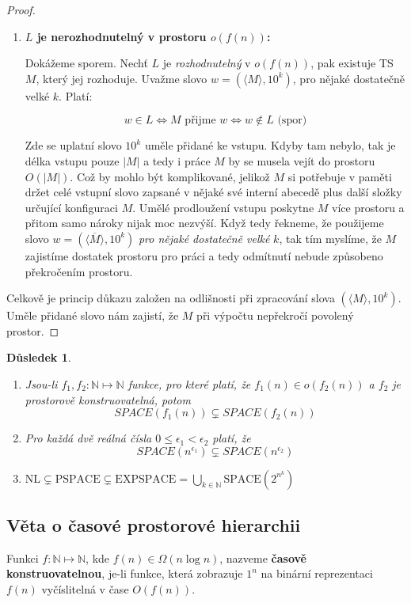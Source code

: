\documentclass[11pt]{report} %
\newcommand{\N}{\mathbb{N}}
\newtheorem{implication}{Důsledek}[section]
\numberwithin{equation}{section}
\begin{document}
\begin{proof}
\begin{enumerate}
		\item \textbf{$L$ je nerozhodnutelný v prostoru $o(f(n))$:}
		
		Dokážeme sporem. Nechť $L$ je \textit{rozhodnutelný} v $o(f(n))$, pak existuje TS $M$, který jej rozhoduje. Uvažme slovo $w = (\langle M \rangle, 10^k)$, pro nějaké dostatečně velké $k$. Platí:

		$$w \in L \Leftrightarrow M \text{ přijme } w \Leftrightarrow w \notin L \text{ (spor)}$$

		
		Zde se uplatní slovo $10^k$ uměle přidané ke vstupu. Kdyby tam nebylo, tak je délka vstupu pouze $|M|$ a tedy i práce $M$ by se musela vejít do prostoru $O(|M|)$. Což by mohlo být komplikované, jelikož $M$ si potřebuje v paměti držet celé vstupní slovo zapsané v nějaké své interní abecedě plus další složky určující konfiguraci $M$. Umělé prodloužení vstupu poskytne $M$ více prostoru a přitom samo nároky nijak moc nezvýší. Když tedy řekneme, že použijeme slovo $w = (\langle \overline{M} \rangle, 10^k)$ \textit{pro nějaké dostatečně velké} $k$, tak tím myslíme, že $M$ zajistíme dostatek prostoru pro práci a tedy odmítnutí nebude způsobeno překročením prostoru.
	\end{enumerate}
	
	Celkově je princip důkazu založen na odlišnosti při zpracování slova $(\langle M \rangle, 10^k)$. Uměle přidané slovo nám zajistí, že $M$ při výpočtu nepřekročí povolený prostor.
\end{proof}
	
\begin{implication}	~
	\begin{enumerate}
		\item Jsou-li $f_1, f_2 : \N \mapsto \N$ funkce, pro které platí, že $f_1(n) \in o(f_2(n))$ a $f_2$ je prostorově konstruovatelná, potom 
			$$SPACE(f_1(n)) \subsetneq SPACE(f_2(n))$$
		\item Pro každá dvě reálná čísla $0 \leq \epsilon_1 < \epsilon_2$ platí, že
			$$SPACE(n^{\epsilon_1}) \subsetneq SPACE(n^{\epsilon_2})$$
		\item $\text{NL} \subsetneq \text{PSPACE} \subsetneq \text{EXPSPACE} = \bigcup_{k\in\N} \text{SPACE}(2^{n^k})$
	\end{enumerate}

\end{implication}

\subsection{Věta o časové prostorové hierarchii}
Funkci $f : \N \mapsto \N$, kde $f(n) \in \Omega(n\log n)$, nazveme \textbf{časově konstruovatelnou}, je-li funkce, která zobrazuje $1^n$ na binární reprezentaci $f(n)$ vyčíslitelná v čase $O(f(n))$.
\end{document}
